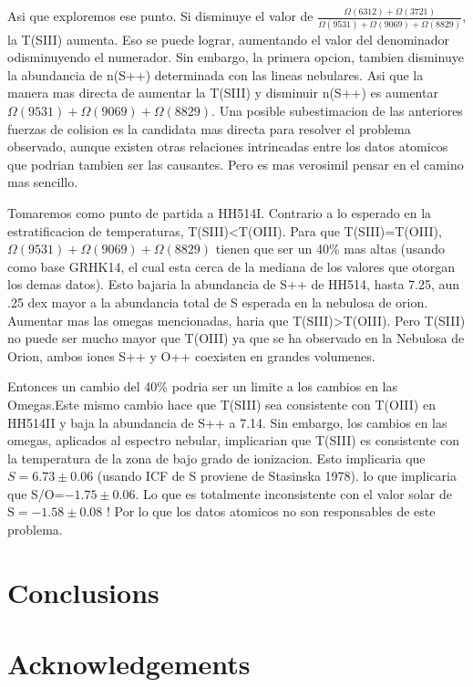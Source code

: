 \documentclass[fleqn,usenatbib]{mnras}
\begin{document}
Asi que exploremos ese punto. Si disminuye el valor de $\frac{\Omega(6312)+\Omega(3721)}{\Omega(9531)+\Omega(9069)+\Omega(8829)}$, la T(SIII) aumenta. Eso se puede lograr, aumentando el valor del denominador odisminuyendo el numerador. Sin embargo, la primera opcion, tambien disminuye la abundancia de n(S++) determinada con las lineas nebulares. Asi que la manera mas directa de aumentar la T(SIII) y disminuir n(S++) es aumentar $\Omega(9531)+\Omega(9069)+\Omega(8829)$. Una posible subestimacion de las anteriores fuerzas de colision es la candidata mas directa para resolver el problema observado, aunque existen otras relaciones intrincadas entre los datos atomicos que podrian tambien ser las causantes. Pero es mas verosimil pensar en el camino mas sencillo.


Tomaremos como punto de partida a HH514I. Contrario a lo esperado en la estratificacion de temperaturas, T(SIII)<T(OIII). Para que T(SIII)=T(OIII), $\Omega(9531)+\Omega(9069)+\Omega(8829)$  tienen que ser un 40\% mas altas (usando como base GRHK14, el cual esta cerca de la mediana de los valores que otorgan los demas datos). Esto bajaria la abundancia de S++ de HH514, hasta 7.25, aun .25 dex mayor a la abundancia total de S esperada en la nebulosa de orion. Aumentar mas las omegas mencionadas, haria que T(SIII)>T(OIII). Pero T(SIII) no puede ser mucho mayor que T(OIII) ya que se ha observado en la Nebulosa de Orion, ambos iones S++ y O++ coexisten en grandes volumenes.

Entonces un cambio del 40\% podria ser un limite a los cambios en las Omegas.Este mismo cambio hace que T(SIII) sea consistente con T(OIII) en HH514II y baja la abundancia de S++ a 7.14. Sin embargo, los cambios en las omegas, aplicados al espectro nebular, implicarian que T(SIII) es consistente con la temperatura de la zona de bajo grado de ionizacion. Esto implicaria que $S=6.73 \pm 0.06$ (usando ICF de S proviene de Stasinska 1978). lo que implicaria que S/O=$-1.75 \pm 0.06$. Lo que es totalmente inconsistente con el valor solar de \(\text{S} = -1.58  \pm 0.08\) ! Por lo que los datos atomicos no son responsables de este problema.






\section{Conclusions}

\section*{Acknowledgements}
\end{document}
